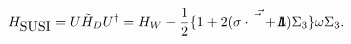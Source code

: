 \begin{equation}
\label{HS}
H_{\hbox{SUSI}}=U\tilde{H}_{D}U^{\dagger}=
H_W - {1\over
2}\{1+2(\vec{\sigma\cdot\vec{L}+{\bf 1}})\Sigma_{3}\}\omega \Sigma_{3}.
\end{equation}

